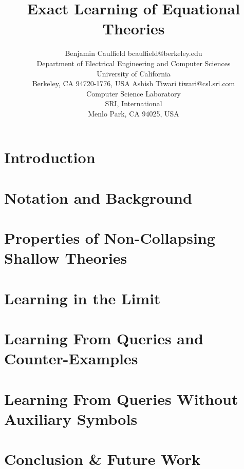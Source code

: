 




\title{Exact Learning of Equational Theories }
\editor{}

\author{\name Benjamin Caulfield \email bcaulfield@berkeley.edu \\
       \addr Department of Electrical Engineering and Computer Sciences\\
       University of California\\
        Berkeley, CA 94720-1776, USA
       \AND
       \name Ashish Tiwari \email tiwari@csl.sri.com \\
       \addr Computer Science Laboratory\\
       SRI, International\\
       Menlo Park, CA 94025, USA}

\maketitle

\begin{abstract}

\end{abstract}

\section{Introduction}


\section{Notation and Background}


\section{Properties of Non-Collapsing Shallow Theories}


\section{Learning in the Limit}


\section{Learning From Queries and Counter-Examples}


\section{Learning From Queries Without Auxiliary Symbols}


\section{Conclusion \& Future Work}







  